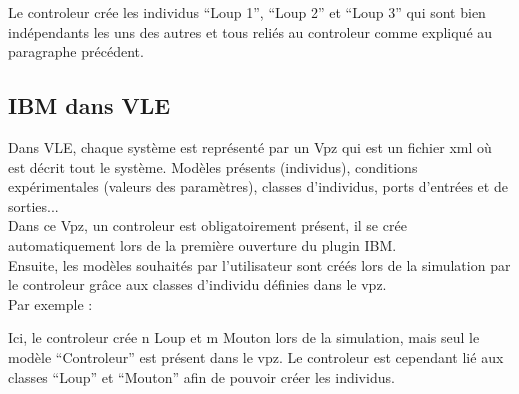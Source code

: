Le controleur crée les individus ``Loup 1'', ``Loup 2'' et ``Loup 3'' qui sont bien indépendants les uns des autres et tous reliés au controleur comme expliqué au paragraphe précédent. \\

\subsection{IBM dans VLE}
Dans VLE, chaque système est représenté par un Vpz qui est un fichier xml où est décrit tout le système. Modèles présents (individus), conditions expérimentales (valeurs des paramètres), classes d'individus, ports d'entrées et de sorties...\\
Dans ce Vpz, un controleur est obligatoirement présent, il se crée automatiquement lors de la première ouverture du plugin IBM. \\Ensuite, les modèles souhaités par l'utilisateur sont créés lors de la simulation par le controleur grâce aux classes d'individu définies dans le vpz.\\
Par exemple : \\
\begin{minipage}{\linewidth}%
\end{minipage}

Ici, le controleur crée n Loup et m Mouton lors de la simulation, mais seul le modèle ``Controleur'' est présent dans le vpz. Le controleur est cependant lié aux classes ``Loup'' et ``Mouton'' afin de pouvoir créer les individus.

